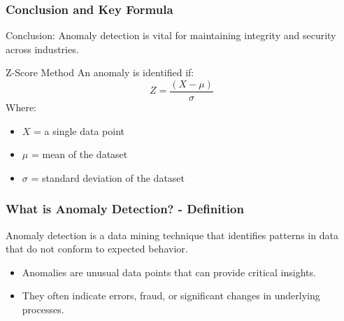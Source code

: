 \documentclass{beamer}
\begin{document}
\begin{frame}[fragile]
    \frametitle{Conclusion and Key Formula}
    Conclusion: Anomaly detection is vital for maintaining integrity and security across industries.

    \begin{block}{Z-Score Method}
        An anomaly is identified if:
        \begin{equation}
        Z = \frac{(X - \mu)}{\sigma}
        \end{equation}
        Where:
        \begin{itemize}
            \item \(X\) = a single data point
            \item \(\mu\) = mean of the dataset
            \item \(\sigma\) = standard deviation of the dataset
        \end{itemize}
    \end{block}
\end{frame}

\begin{frame}[fragile]
    \frametitle{What is Anomaly Detection? - Definition}
    Anomaly detection is a data mining technique that identifies patterns in data that do not conform to expected behavior. 
    \begin{itemize}
        \item Anomalies are unusual data points that can provide critical insights.
        \item They often indicate errors, fraud, or significant changes in underlying processes.
    \end{itemize}
\end{frame}
\end{document}
